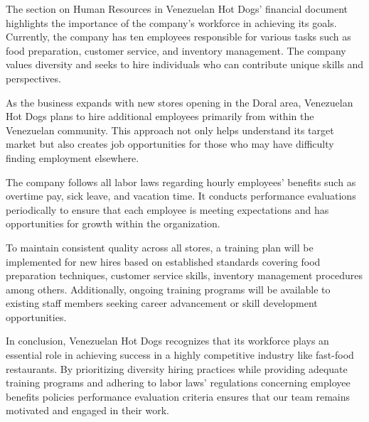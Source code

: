 The section on Human Resources in Venezuelan Hot Dogs' financial document highlights the importance of the company's workforce in achieving its goals. Currently, the company has ten employees responsible for various tasks such as food preparation, customer service, and inventory management. The company values diversity and seeks to hire individuals who can contribute unique skills and perspectives.

As the business expands with new stores opening in the Doral area, Venezuelan Hot Dogs plans to hire additional employees primarily from within the Venezuelan community. This approach not only helps understand its target market but also creates job opportunities for those who may have difficulty finding employment elsewhere.

The company follows all labor laws regarding hourly employees' benefits such as overtime pay, sick leave, and vacation time. It conducts performance evaluations periodically to ensure that each employee is meeting expectations and has opportunities for growth within the organization.

To maintain consistent quality across all stores, a training plan will be implemented for new hires based on established standards covering food preparation techniques, customer service skills, inventory management procedures among others. Additionally, ongoing training programs will be available to existing staff members seeking career advancement or skill development opportunities.

In conclusion, Venezuelan Hot Dogs recognizes that its workforce plays an essential role in achieving success in a highly competitive industry like fast-food restaurants. By prioritizing diversity hiring practices while providing adequate training programs and adhering to labor laws' regulations concerning employee benefits policies performance evaluation criteria ensures that our team remains motivated and engaged in their work.